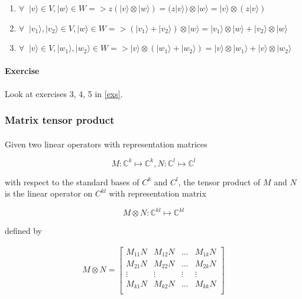\documentclass[a4paper,10pt]{article}
\begin{document}
\begin{enumerate}
    \item $\forall \; \; |v\rangle \in V, |w\rangle \in W => z(|v\rangle \otimes |w\rangle) = (z|v\rangle) \otimes |w\rangle = |v\rangle \otimes (z|v\rangle)$
    \item $\forall \; \; |v_1\rangle, |v_2\rangle \in V, |w\rangle \in W => (|v_1\rangle + |v_2\rangle) \otimes |w\rangle = |v_1\rangle \otimes |w\rangle + |v_2\rangle \otimes |w\rangle$
    \item $\forall \; \; |v\rangle \in V, |w_1\rangle, |w_2\rangle \in W => |v\rangle \otimes (|w_1\rangle + |w_2\rangle) = |v\rangle \otimes |w_1\rangle + |v\rangle \otimes |w_2\rangle$
\end{enumerate}

\paragraph{Exercise} Look at exercises 3, 4, 5 in \autoref{exs}.

\subsubsection{Matrix tensor product}

\paragraph{} Given two linear operators with representation matrices

$$M: \mathbb{C}^k \mapsto \mathbb{C}^k, N: \mathbb{C}^l \mapsto \mathbb{C}^l$$

with respect to the standard bases of $C^k$ and $C^l$, the tensor product of $M$ and $N$ is the linear operator on $C^{kl}$ with representation matrix

$$M \otimes N: \mathbb{C}^{kl} \mapsto \mathbb{C}^{kl}$$

defined by

\begin{equation*}
\begin{aligned}
M \otimes N = {\begin{bmatrix}
M_{11}N & M_{12}N & \ldots & M_{1k}N \\
M_{21}N & M_{22}N & \ldots & M_{2k}N \\
\vdots & \vdots & \vdots & \vdots  \\
M_{k1}N & M_{k2}N & \ldots & M_{kk}N \\
\end{bmatrix}}
\end{aligned}
\end{equation*}
\end{document}
